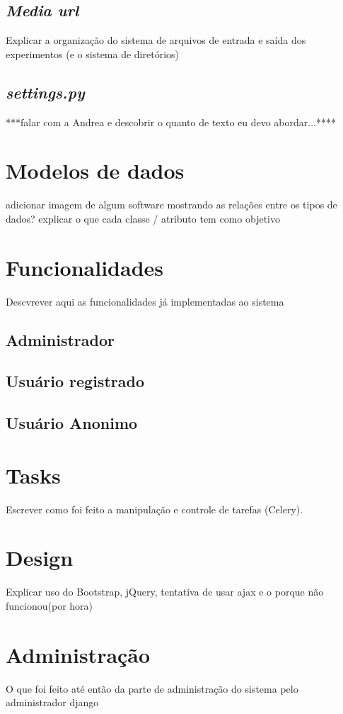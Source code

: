 \documentclass[tg]{mdtufsm}
\begin{document}
\subsection{\emph{Media url}}
Explicar a organização do sistema de arquivos de entrada e saída dos experimentos (e o sistema de diretórios)
\subsection{\emph{settings.py}}
***falar com a Andrea e descobrir o quanto de texto eu devo abordar...****


\section{Modelos de dados}
adicionar imagem de algum software mostrando as relações entre os tipos de dados?
explicar o que cada classe / atributo tem como objetivo
\section{Funcionalidades}
Descvrever aqui as funcionalidades já implementadas ao sistema

\subsection{Administrador}
\subsection{Usuário registrado}
\subsection{Usuário Anonimo}
\section{Tasks}
Escrever como foi feito a manipulação e controle de tarefas (Celery).
\section{Design}
Explicar uso do Bootstrap,
jQuery,
tentativa de usar ajax e o porque não funcionou(por hora)
\section{Administração}
O que foi feito até então da parte de administração do sistema pelo administrador django
\iffalse
\end{document}
